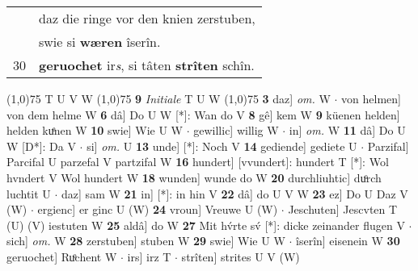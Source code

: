 \documentclass[8pt,a4paper,notitlepage]{article}
\begin{document}
\begin{table}[ht]
\begin{minipage}[t]{0.5\linewidth}
\begin{tabular}{rl}
 & daz die ringe vor den knien zerstuben,\\ 
 & swie si \textbf{wæren} îserîn.\\ 
30 & \textbf{geruochet} ir\textit{s}, si tâten \textbf{strîten} schîn.\\ 
\end{tabular}
\scriptsize
\line(1,0){75} \newline
T U V W \newline
\line(1,0){75} \newline
\textbf{9} \textit{Initiale} T U W  \newline
\line(1,0){75} \newline
\textbf{3} daz] \textit{om.} W  $\cdot$ von helmen] von dem helme W \textbf{6} dâ] Do U W [*]: Wan do V \textbf{8} gê] kem W \textbf{9} küenen helden] helden kuͤnen W \textbf{10} swie] Wie U W  $\cdot$ gewillic] willig W  $\cdot$ in] \textit{om.} W \textbf{11} dâ] Do U W [D*]: Da V  $\cdot$ si] \textit{om.} U \textbf{13} unde] [*]: Noch V \textbf{14} gediende] gediete U  $\cdot$ Parzifal] Parcifal U parzefal V partzifal W \textbf{16} hundert] [vvundert]: hundert T [*]: Wol hvndert V Wol hundert W \textbf{18} wunden] wunde do W \textbf{20} durchliuhtic] duͦrch luchtit U  $\cdot$ daz] sam W \textbf{21} in] [*]: in hin V \textbf{22} dâ] do U V W \textbf{23} ez] Do U Daz V (W)  $\cdot$ ergienc] er ginc U (W) \textbf{24} vroun] Vreuwe U (W)  $\cdot$ Jeschuten] Jescvten T (U) (V) iestuten W \textbf{25} aldâ] do W \textbf{27} Mit hv́rte sv́ [*]: dicke zeinander flugen V  $\cdot$ sich] \textit{om.} W \textbf{28} zerstuben] stuben W \textbf{29} swie] Wie U W  $\cdot$ îserîn] eisenein W \textbf{30} geruochet] Ruͦchent W  $\cdot$ irs] irz T  $\cdot$ strîten] strites U V (W) \newline
\end{minipage}
\end{table}
\end{document}
